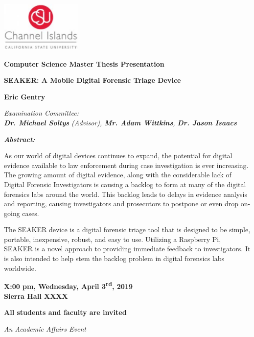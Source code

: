 \documentclass{article}
\begin{document}
\begin{center}

\includegraphics[width=0.3\textwidth]{CI_Logo.png}\\

\hfill\break

\LARGE
\textbf{\color{grey}Computer Science Master Thesis Presentation}\\

\hfill\break
\hfill\break

\Large
{\bf SEAKER: A Mobile Digital Forensic Triage Device}\\

\vspace{5mm}

\large
{\bf Eric Gentry}\\

\vspace{5mm}

\large
\textit{ Examination Committee:\\
{\bf Dr. Michael Soltys} (Advisor), {\bf Mr. Adam Wittkins}, {\bf
Dr. Jason Isaacs}}\\

\hfill\break

\end{center}

\begin{adjustwidth}{1in}{1in}
\textit{\bf Abstract:}\\

\vspace{3mm}

\normalsize
\noindent As our world of digital devices continues to
expand, the potential for digital evidence available to
law enforcement during case investigation is ever increasing.
The growing amount of digital evidence, along with the
considerable lack of Digital Forensic Investigators is
causing a backlog to form at many of the digital forensics
labs around the world. This backlog leads to delays in
evidence analysis and reporting, causing investigators and
prosecutors to postpone or even drop on-going cases.

The SEAKER device is a digital forensic triage tool that is
designed to be simple, portable, inexpensive, robust, and
easy to use. Utilizing a Raspberry Pi,
SEAKER is a novel approach to
providing immediate feedback to investigators. It is also
intended to help stem the backlog problem in digital
forensics labs worldwide.
\end{adjustwidth}

\hfill\break

\begin{center}

\LARGE
{\bf X:00 pm, Wednesday, April 3\textsuperscript{rd}, 2019\\
Sierra Hall XXXX}\\

\vspace{15mm}

\large
{\bf All students and faculty are invited}\\

\hfill\break

\small
{\it An Academic Affairs Event}

\end{center}
\end{document}
